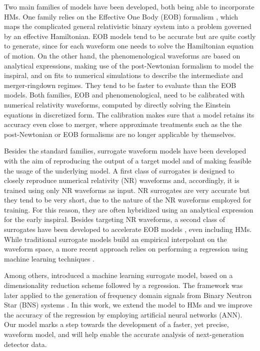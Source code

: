 \documentclass[twocolumn,showpacs,preprintnumbers,nofootinbib,prd,
superscriptaddress,10pt]{revtex4-2}
\begin{document}
Two main families of models have been developed, both being able to incorporate HMs.
One family relies on the Effective One Body (EOB) formalism 
\cite{Buonanno:2000ef, Damour:2009kr, Cotesta:2018fcv, Nagar:2020pcj, Chiaramello:2020ehz, Ossokine:2020kjp, Ramos-Buades:2023ehm, Nagar:2021gss}, 
which maps the complicated general relativistic binary system into a problem governed by an effective Hamiltonian. 
EOB models tend to be accurate but are quite costly to generate, since for each waveform one needs to solve the 
Hamiltonian equation of motion.
On the other hand, the phenomenological waveforms \cite{Khan:2015jqa,Pratten:2020ceb,Estelles:2020osj} are based on 
analytical expressions, making use of the post-Newtonian formalism to model the inspiral, and on fits to numerical
simulations to describe the intermediate and merger-ringdown regimes. They tend to be faster to evaluate than the EOB models.
Both families, EOB and phenomenological, need to be calibrated with numerical relativity waveforms, 
computed by directly solving the Einstein equations in discretized form. The calibration makes sure that a model 
retains its accuracy even close to merger, where approximate treatments such as the the post-Newtonian or EOB formalisms 
are no longer applicable by themselves.

Besides the standard families, surrogate waveform models have been developed with the aim of reproducing the 
output of a target model and of making feasible the usage of the underlying model.
%
A first class of surrogates is designed to closely reproduce numerical relativity (NR) waveforms \cite{Blackman:2015pia, Varma:2018mmi, Blackman:2017dfb, Blackman:2017pcm, Varma:2019csw, Williams:2019vub, Rifat:2019ltp} and, accordingly, it is trained using only NR waveforms as input. NR surrogates are very accurate but they tend to be very short, due to the nature of the NR waveforms employed for training. For this reason, they are often hybridized using an analytical expression for the early inspiral.
%
Besides targeting NR waveforms, a second class of surrogates have been developed to accelerate EOB models \cite{Field:2013cfa, Purrer:2014fza, Purrer:2015tud, Cotesta:2020qhw, Gadre:2022sed}, even including HMs. While traditional surrogate 
models build an empirical interpolant on the waveform space, a more recent approach relies on performing a regression 
using machine learning techniques \cite{Chua:2018woh, Khan:2020fso, Thomas:2022rmc}.

Among others, \cite{Schmidt:2020yuu} introduced a machine learning surrogate model, based on a dimensionality 
reduction scheme followed by a regression. The framework was later applied to the generation of frequency domain signals from Binary Neutron Star (BNS) systems \cite{Tissino:2022thn}.
In this work, we extend the model to HMs and we improve the accuracy 
of the regression by employing artificial neural networks (ANN). Our model marks a step towards the development of a faster, yet precise, waveform model, and will help enable the accurate analysis of next-generation detector data.
\end{document}
